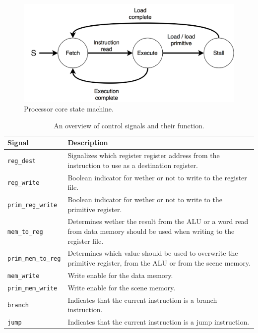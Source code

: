 \begin{figure}[h!]
    \centering
    \includegraphics[width=0.7\linewidth]{images/state-machine.png}
    \caption{Processor core state machine.}
    \label{fig:state-machine}
\end{figure}

\begin{table}
    \centering
    \begin{tabular}{|p{5cm}|p{7cm}|}
        \hline
        Signal             & Description                                                                                                                 \\ \hline
        \texttt{reg\_dest}          & Signalizes which register register address from the instruction to use as a destination register.                           \\ \hline
        \texttt{reg\_write}         & Boolean indicator for wether or not to write to the register file.                                                          \\ \hline
        \texttt{prim\_reg\_write}   & Boolean indicator for wether or not to write to the primitive register.                                                     \\ \hline
        \texttt{mem\_to\_reg}       & Determines wether the result from the ALU or a word read from data memory should be used when writing to the register file. \\ \hline
        \texttt{prim\_mem\_to\_reg} & Determines which value should be used to overwrite the primitive register, from the ALU or from the scene memory.           \\ \hline
        \texttt{mem\_write}         & Write enable for the data memory.                                                                                           \\ \hline
        \texttt{prim\_mem\_write}   & Write enable for the scene memory.                                                                                          \\ \hline
        \texttt{branch}             & Indicates that the current instruction is a branch instruction.                                                             \\ \hline
        \texttt{jump}               & Indicates that the current instruction is a jump instruction.                                                               \\ \hline
    \end{tabular}
    \caption{An overview of control signals and their function.}
    \label{tbl:control-signals}
\end{table}
